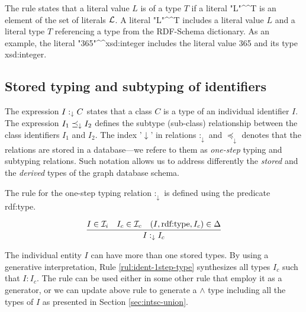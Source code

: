 \documentclass[runningheads]{llncs}
\newcommand{\darr}{\downarrow}
\newcommand{\Lt}{{\cal L}}
\newcommand{\Ii}{{\cal I}_i}
\newcommand{\Ic}{{\cal I}_c}
\newcommand{\memo}[1]{}
\newcommand{\notes}[1]{\noindent\begin{small}-- \emph{#1}\hfill\break\end{small}}
\begin{document}
The rule states that a literal value $L$ is of a type $T$ if a literal
"L"\textasciicircum\textasciicircum\/T is an element of the set of
literals $\Lt$. A literal "L"\textasciicircum\textasciicircum\/T
includes a literal value $L$ and a literal type $T$ referencing a type
from the RDF-Schema dictionary. As an example, the literal
"365"\textasciicircum\textasciicircum\/xsd:integer includes the
literal value 365 and its type xsd:integer.





\subsection{Stored typing and subtyping of identifiers\label{sec:idents-stored}}

The expression $I:_\darr\/C$ states that a class $C$ is a type of an
individual identifier $I$. The expression $I_1\preceq_\darr\/I_2$
defines the subtype (sub-class) relationship between the class
identifiers $I_1$ and $I_2$. The index '$\darr$' in relations
$:_\darr$ and $\preceq_\darr$ denotes that the relations are stored in
a database---we refere to them as \emph{one-step} typing and subtyping
relations. Such notation allows us to address differently the
\emph{stored} and the \emph{derived} types of the graph database
schema.


\memo{Oportunity to introduce ``mixed'' objects including ground and schema components.}

The rule for the one-step typing relation $:_\darr$ is defined using
the predicate rdf:type.

\begin{equation}
\label{rul:ident-1step-type}
\dfrac{I\in\Ii\quad I_c\in\Ic\quad (I,\text{rdf:type},I_c)\in \D}
      {I :_\darr I_c}
\end{equation}

The individual entity $I$ can have more than one stored types. By
using a generative interpretation, Rule \ref{rul:ident-1step-type}
synthesizes all types $I_c$ such that $I:I_c$. The rule can be used
either in some other rule that employ it as a generator, or we can
update above rule to generate a $\land$ type including all the types
of $I$ as presented in Section \ref{sec:intsc-union}.
\end{document}
